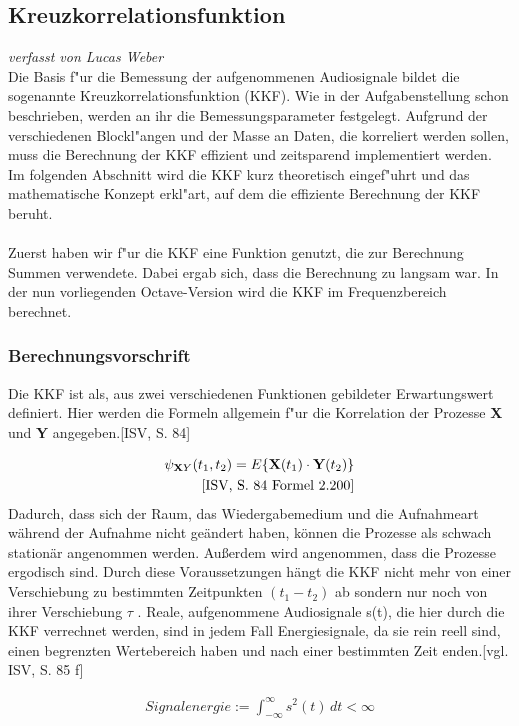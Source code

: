 \subsection{Kreuzkorrelationsfunktion}
\textit{verfasst von Lucas Weber\\}
Die Basis f"ur die Bemessung der aufgenommenen Audiosignale bildet die sogenannte Kreuzkorrelationsfunktion (KKF). Wie in der Aufgabenstellung schon beschrieben, werden an ihr die Bemessungsparameter festgelegt. Aufgrund der verschiedenen Blockl"angen und der Masse an Daten, die korreliert werden sollen, muss die Berechnung der KKF effizient und zeitsparend implementiert werden. Im folgenden Abschnitt wird die KKF kurz theoretisch eingef"uhrt und das mathematische Konzept erkl"art, auf dem die effiziente Berechnung der KKF beruht.
\\\\
Zuerst haben wir f"ur die KKF eine Funktion genutzt, die zur Berechnung Summen verwendete. Dabei ergab sich, dass die Berechnung zu langsam war. In der nun vorliegenden Octave-Version wird die KKF im Frequenzbereich berechnet.
\subsubsection{Berechnungsvorschrift}
Die KKF ist als, aus zwei verschiedenen Funktionen gebildeter Erwartungswert definiert. Hier werden die Formeln allgemein f"ur die Korrelation der Prozesse \textbf{X} und \textbf{Y} angegeben.[ISV, S. 84] 

\begin{align}
\psi_{\textbf XY}(t_1, t_2) = E\lbrace\textbf{X}(t_1)\cdot\textbf{Y}(t_2)\rbrace\\\text{[ISV, S. 84 Formel 2.200]}
\end{align}
Dadurch, dass sich der Raum, das Wiedergabemedium und die Aufnahmeart während der Aufnahme nicht geändert haben, können die Prozesse als schwach stationär angenommen werden. Außerdem wird angenommen, dass die Prozesse ergodisch sind. Durch diese Voraussetzungen hängt die KKF nicht mehr von einer Verschiebung zu bestimmten Zeitpunkten $(t_1 - t_2)$ ab sondern nur noch von ihrer Verschiebung $\tau$ . Reale, aufgenommene Audiosignale s(t), die hier durch die KKF verrechnet werden, sind in jedem Fall Energiesignale, da sie rein reell sind, einen begrenzten Wertebereich haben und nach einer bestimmten Zeit enden.[vgl. ISV, S. 85 f]

\begin{align}
Signalenergie := \int_{-\infty}^{\infty} s^2(t) \,dt < \infty
\end{align}

